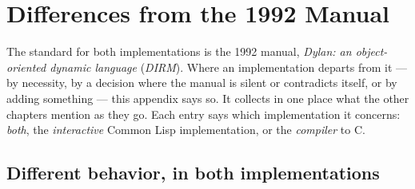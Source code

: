 \chapter{Differences from the 1992 Manual}\label{app:differences}
\sloppy

The standard for both implementations is the 1992 manual,
\emph{Dylan: an object-oriented dynamic language} (\textsl{DIRM}). Where
an implementation departs from it --- by necessity, by a decision where
the manual is silent or contradicts itself, or by adding something ---
this appendix says so. It collects in one place what the other chapters
mention as they go. Each entry says which implementation it concerns:
\emph{both}, the \emph{interactive} Common Lisp implementation, or the
\emph{compiler} to C.

\section{Different behavior, in both implementations}
\label{sec:diff-both}

